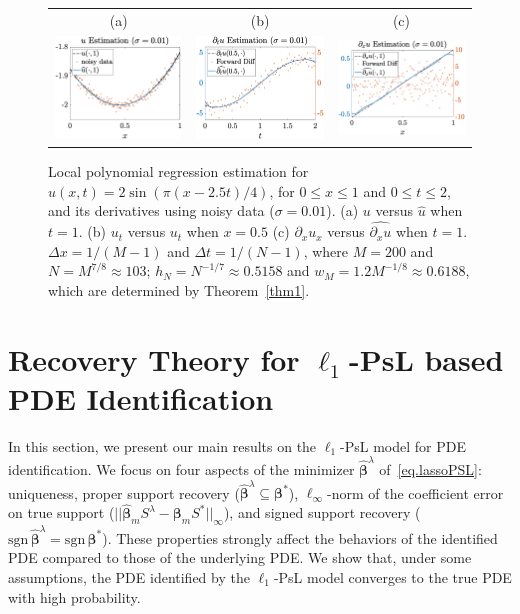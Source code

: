 \documentclass[a4paper,11pt]{article}
\newcommand{\bbeta}{\bm{\beta}}
\begin{document}
\begin{figure}
\centering
\begin{tabular}{ccc}
(a)&(b)&(c)\\
\includegraphics[width=2in]{Figures/localpolyExp1_slow.eps}&
\includegraphics[width=2in]{Figures/localpolyExp3_slow.eps}&
\includegraphics[width=2in]{Figures/localpolyExp2_slow.eps}
\end{tabular}
\caption{Local polynomial regression estimation for  $u(x,t) = 2\sin(\pi(x-2.5t)/4)$, for $0\leq x\leq 1$ and $0\leq t\leq 2$, and its derivatives using noisy data ($\sigma=0.01$). (a) $u$ versus $\widehat{u}$ when $t=1$. (b) $u_t$ versus $\widehat{u_t}$ when $x=0.5$ (c) $\partial_xu_x$ versus $\widehat{\partial_xu}$ when $t=1$.  $\Delta x=1/(M-1)$ and $\Delta t = 1/(N-1)$, where $M=200$ and $N=M^{7/8}\approx103$; $h_N=N^{-1/7}\approx0.5158$ and $w_M=1.2M^{-1/8}\approx0.6188$, which are determined by Theorem~\ref{thm1}.}\label{fig.derapprox}	
\end{figure}




\section{Recovery Theory for $\ell_1$-PsL based PDE Identification}
In this section, we present our main results on the $\ell_1$-PsL model for PDE identification. We focus on four aspects of the minimizer $\widehat{\bbeta}^\lambda$ of~\eqref{eq.lassoPSL}: uniqueness, proper support recovery ($\widehat{\bbeta}^\lambda\subseteq\bbeta^*$), $\ell_\infty$-norm of the coefficient error on true support ($||\widehat{\bbeta}_mS^\lambda-\bbeta_mS^*||_\infty$), and signed support recovery ($\text{sgn}\,\widehat{\bbeta}^\lambda=\text{sgn}\,\bbeta^*$). These properties strongly affect the behaviors of the identified PDE compared to those of the underlying PDE. We show that, under some assumptions, the PDE identified by the $\ell_1$-PsL model converges to the true PDE with high probability.
\end{document}
